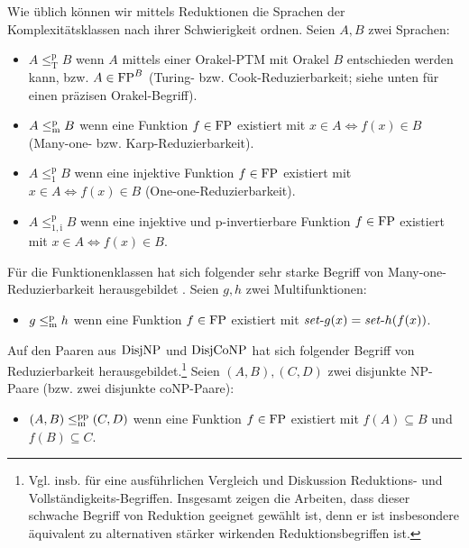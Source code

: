Wie üblich können wir mittels Reduktionen die Sprachen der Komplexitätsklassen nach ihrer Schwierigkeit ordnen. Seien $A,B$ zwei Sprachen:
\begin{itemize}
    \item $A\leq_\mathrm{T}^\mathrm{p} B$ wenn $A$ mittels einer Orakel-PTM mit Orakel $B$ entschieden werden kann, bzw. $A\in\mathrm{FP}^B$ (Turing- bzw. Cook-Reduzierbarkeit; siehe unten für einen präzisen Orakel-Begriff).
    \item $A\leq_\mathrm{m}^\mathrm{p} B$ wenn eine Funktion $f\in\mathrm{FP}$ existiert mit $x\in A\iff f(x)\in B$ (Many-one- bzw. Karp-Reduzierbarkeit).
    \item $A\leq_1^\mathrm{p} B$ wenn eine injektive Funktion $f\in\mathrm{FP}$ existiert mit $x\in A\iff f(x)\in B$ (One-one-Reduzierbarkeit).
    \item $A\leq_\mathrm{1,i}^\mathrm{p} B$ wenn eine injektive und p-invertierbare Funktion $f\in\mathrm{FP}$ existiert mit $x\in A\iff f(x)\in B$.
\end{itemize}
Für die Funktionenklassen hat sich folgender sehr starke Begriff von Many-one-Reduzierbarkeit herausgebildet \parencites(vgl.)(){kobler_is_2000}{beyersdorff_nondeterministic_2009}{pudlak_incompleteness_2017}. Seien $g,h$ zwei Multifunktionen:
\begin{itemize}
    \item $g\leq_\mathrm{m}^\mathrm{p} h$ wenn eine Funktion $f\in\mathrm{FP}$ existiert mit $\mathit{set}\text{-}{}g(x)=\mathit{set}\text{-}{}h(f(x))$.
\end{itemize}
Auf den Paaren aus $\mathrm{DisjNP}$ und $\mathrm{DisjCoNP}$ hat sich folgender Begriff von Reduzierbarkeit herausgebildet.\footnote{Vgl. insb. \textcites{glaser_disjoint_2004}{glaser_reductions_2005} für eine ausführlichen Vergleich und Diskussion Reduktions- und Vollständigkeits-Begriffen. Insgesamt zeigen die Arbeiten,  dass dieser schwache Begriff von Reduktion geeignet gewählt ist, denn er ist insbesondere äquivalent zu alternativen stärker wirkenden Reduktionsbegriffen ist.}
Seien $(A,B), (C,D)$ zwei disjunkte NP-Paare (bzw. zwei disjunkte coNP-Paare):
\begin{itemize}
    \item $(A,B)\leq_\mathrm{m}^\mathrm{pp}(C,D)$ wenn eine Funktion $f\in\mathrm{FP}$ existiert mit $f(A)\subseteq B$ und $f(B)\subseteq C$.
\end{itemize}

